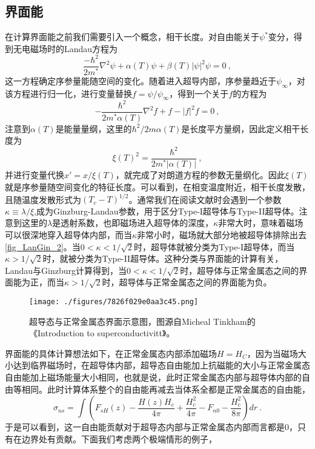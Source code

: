 \subsection{界面能}
在计算界面能之前我们需要引入一个概念，相干长度。对自由能关于$\psi^*$变分，得到无电磁场时的Landau方程为
\begin{equation}
\frac{-\hbar^2}{2m^*}\nabla^2 \psi + \alpha(T)\psi + \beta(T)|\psi|^2 \psi = 0~,
\end{equation}
这一方程确定序参量能随空间的变化。随着进入超导内部，序参量趋近于$\psi_{\infty}$，对该方程进行归一化，进行变量替换$f= \psi/\psi_{\infty}$，得到一个关于$f$的方程为
\begin{equation}
-\frac{\hbar^2}{2m^* \alpha(T)} \nabla^2 f + f - |f|^2 f =0 ~,
\end{equation}
注意到$\alpha(T)$是能量量纲，这里的$\hbar^2/2m \alpha(T)$是长度平方量纲，因此定义相干长度为
\begin{equation}
\xi(T)^2 =\frac{\hbar^2}{2m^* |\alpha(T)|}~,
\end{equation}
并进行变量代换$x' = x/\xi(T)$，就完成了对朗道方程的参数无量纲化。因此$\xi(T)$就是序参量随空间变化的特征长度。可以看到，在相变温度附近，相干长度发散，且随温度发散形式为$(T_c-T)^{1/2}$。通常我们在阅读文献时会遇到一个参数$\kappa \equiv \lambda/\xi$,成为Ginzburg-Landau参数，用于区分Type-I超导体与Type-II超导体。注意到这里的$\lambda$是透射系数，也即磁场进入超导体的深度，$\kappa$非常大时，意味着磁场可以很深地穿入超导体内部，而当$\kappa$非常小时，磁场就大部分地被超导体排除出去\autoref{fig_LanGin_2}。当$0<\kappa<1/\sqrt{2}$时，超导体就被分类为Type-I超导体，而当$\kappa>1/\sqrt{2}$时，就被分类为Type-II超导体。这种分类与界面能的计算有关，Landau与Ginzburg计算得到，当$0<\kappa<1/\sqrt{2}$时，超导体与正常金属态之间的界面能为正，而当$\kappa>1/\sqrt{2}$时，超导体与正常金属态之间的界面能为负。
\begin{figure}[ht]
\centering
\texttt{[image: ./figures/7826f029e0aa3c45.png]}
\caption{超导态与正常金属态界面示意图，图源自Micheal Tinkham的《Introduction to superconductivitt》。} \label{fig_LanGin_2}
\end{figure}
界面能的具体计算想法如下，在正常金属态内部添加磁场$H=H_C$，因为当磁场大小达到临界磁场时，在超导体内部，超导态自由能加上抗磁能的大小与正常金属态自由能加上磁场能量大小相同，也就是说，此时正常金属态内部与超导体内部的自由等相同。此时计算体系整个的自由能再减去当体系全都是正常金属态的自由能，
\begin{equation}
\sigma_{ns} = \int \left( F_{sH}(z) - \frac{H(z)H_c}{4\pi} + \frac{H_c^2}{4\pi} -F_{n0} - \frac{H_c^2}{8\pi}\right)dr~.
\end{equation}
于是可以看到，这一自由能贡献对于超导态内部与正常金属态内部而言都是0，只有在边界处有贡献。下面我们考虑两个极端情形的例子，

